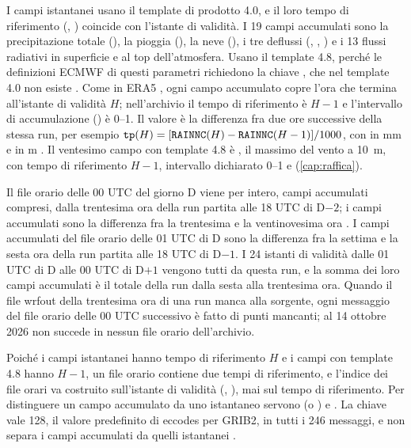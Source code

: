 I campi istantanei usano il template di prodotto 4.0, e il loro tempo di riferimento
(, ) coincide con l'istante di validità. I 19 campi accumulati
sono la precipitazione totale (), la pioggia (), la neve
(), i tre deflussi (, , ) e i 13 flussi radiativi in
superficie e al top dell'atmosfera. Usano il template 4.8, perché le definizioni ECMWF di questi
parametri richiedono la chiave , che nel template 4.0 non esiste
\parencite{eccodes}. Come in ERA5 \parencite{era5doc}, ogni campo accumulato copre l'ora
che termina all'istante di validità $H$; nell'archivio il tempo di riferimento è $H-1$ e
l'intervallo di accumulazione () è 0--1. Il valore è la differenza fra due ore successive della stessa run, per
esempio $\campo{tp}(H) = [\campo{RAINNC}(H) - \campo{RAINNC}(H-1)]/1000$, con  in
\si{mm} e  in \si{m} \parencite{issue70}. Il ventesimo campo con template 4.8 è
, il massimo del vento a \SI{10}{m}, con tempo di riferimento $H-1$, intervallo
dichiarato 0--1 e  (\cref{cap:raffica}).

Il file orario delle 00 UTC del giorno D viene per intero, campi accumulati compresi, dalla
trentesima ora della run partita alle 18 UTC di D$-2$; i campi accumulati sono la differenza fra la
trentesima e la ventinovesima ora \parencite{issue71,issue72}. I campi accumulati del file orario
delle 01 UTC di D sono la differenza fra la settima e la sesta ora della run partita alle 18 UTC di
D$-1$. I 24 istanti di validità dalle 01 UTC di D alle 00 UTC di D$+1$ vengono tutti da questa run, e
la somma dei loro campi accumulati è il totale della run dalla sesta alla trentesima ora. Quando il
file wrfout della trentesima ora di una run manca alla sorgente, ogni messaggio del file orario
delle 00 UTC successivo è fatto di punti mancanti; al 14 ottobre 2026 non succede in nessun file
orario dell'archivio.

Poiché i campi istantanei hanno tempo di riferimento $H$ e i campi con template 4.8 hanno $H-1$, un
file orario contiene due tempi di riferimento, e l'indice dei file orari va costruito sull'istante
di validità (, ), mai sul tempo di riferimento.
Per distinguere un campo accumulato da uno istantaneo servono  (o
) e . La chiave
 vale 128, il valore predefinito di eccodes per GRIB2, in tutti
i 246 messaggi, e non separa i campi accumulati da quelli istantanei \parencite{issue53}.

